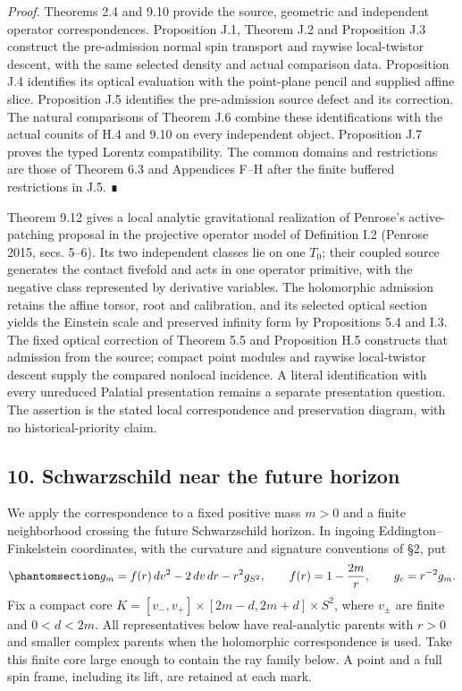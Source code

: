 \documentclass[
  english,
  11pt,
  reqno]{amsart}
\begin{document}
\emph{Proof.} Theorems 2.4 and 9.10 provide the source, geometric and
independent operator correspondences. Proposition J.1, Theorem J.2 and
Proposition J.3 construct the pre-admission normal spin transport and
raywise local-twistor descent, with the same selected density and actual
comparison data. Proposition J.4 identifies its optical evaluation with
the point-plane pencil and supplied affine slice. Proposition J.5
identifies the pre-admission source defect and its correction. The
natural comparisons of Theorem J.6 combine these identifications with
the actual counits of H.4 and 9.10 on every independent object.
Proposition J.7 proves the typed Lorentz compatibility. The common
domains and restrictions are those of Theorem 6.3 and Appendices F--H
after the finite buffered restrictions in J.5. ∎

Theorem 9.12 gives a local analytic gravitational realization of
Penrose's active-patching proposal in the projective operator model of
Definition I.2 (Penrose 2015, secs. 5--6). Its two independent classes
lie on one \(T_0\); their coupled source generates the contact fivefold
and acts in one operator primitive, with the negative class represented
by derivative variables. The holomorphic admission retains the affine
torsor, root and calibration, and its selected optical section yields
the Einstein scale and preserved infinity form by Propositions 5.4 and
I.3. The fixed optical correction of Theorem 5.5 and Proposition H.5
constructs that admission from the source; compact point modules and
raywise local-twistor descent supply the compared nonlocal incidence. A
literal identification with every unreduced Palatial presentation
remains a separate presentation question. The assertion is the stated
local correspondence and preservation diagram, with no
historical-priority claim.

\protect{}\label{sec:gg-schwarzschild-future-horizon}

\subsection{10. Schwarzschild near the future
horizon}\label{schwarzschild-near-the-future-horizon}

We apply the correspondence to a fixed positive mass \(m>0\) and a
finite neighborhood crossing the future Schwarzschild horizon. In
ingoing Eddington--Finkelstein coordinates, with the curvature and
signature conventions of §2, put
\begin{equation}\protect\phantomsection\label{eq:gg-schwarzschild-main-metric}{
 g_m=f(r)\,dv^2-2\,dv\,dr-r^2g_{S^2},\qquad
 f(r)=1-\frac{2m}{r},\qquad g_c=r^{-2}g_m.
}\end{equation} Fix a compact core
\(K=[v_-,v_+]\times[2m-d,2m+d]\times S^2\), where \(v_\pm\) are finite
and \(0<d<2m\). All representatives below have real-analytic parents
with \(r>0\) and smaller complex parents when the holomorphic
correspondence is used. Take this finite core large enough to contain
the ray family below. A point and a full spin frame, including its lift,
are retained at each mark.
\end{document}
